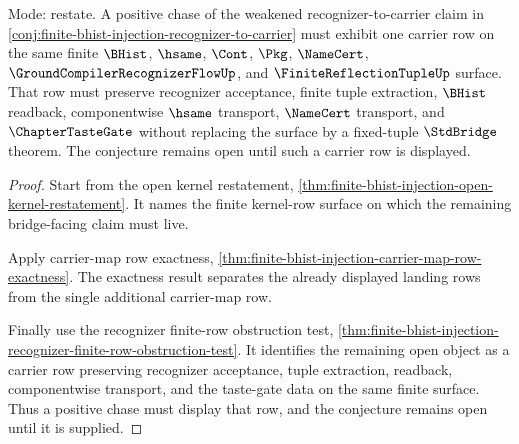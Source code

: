 \begin{theorem}
\label{thm:finite-bhist-injection-carrier-map-positive-test}
Mode: restate. A positive chase of the weakened recognizer-to-carrier claim in \autoref{conj:finite-bhist-injection-recognizer-to-carrier} must exhibit one carrier row on the same finite $\BHist$, $\hsame$, $\Cont$, $\Pkg$, $\NameCert$, $\GroundCompilerRecognizerFlowUp$, and $\FiniteReflectionTupleUp$ surface. That row must preserve recognizer acceptance, finite tuple extraction, $\BHist$ readback, componentwise $\hsame$ transport, $\NameCert$ transport, and $\ChapterTasteGate$ without replacing the surface by a fixed-tuple $\StdBridge$ theorem. The conjecture remains open until such a carrier row is displayed.
\end{theorem}
\begin{proof}
Start from the open kernel restatement, \autoref{thm:finite-bhist-injection-open-kernel-restatement}. It names the finite kernel-row surface on which the remaining bridge-facing claim must live.

Apply carrier-map row exactness, \autoref{thm:finite-bhist-injection-carrier-map-row-exactness}. The exactness result separates the already displayed landing rows from the single additional carrier-map row.

Finally use the recognizer finite-row obstruction test, \autoref{thm:finite-bhist-injection-recognizer-finite-row-obstruction-test}. It identifies the remaining open object as a carrier row preserving recognizer acceptance, tuple extraction, readback, componentwise transport, and the taste-gate data on the same finite surface. Thus a positive chase must display that row, and the conjecture remains open until it is supplied.
\end{proof}

